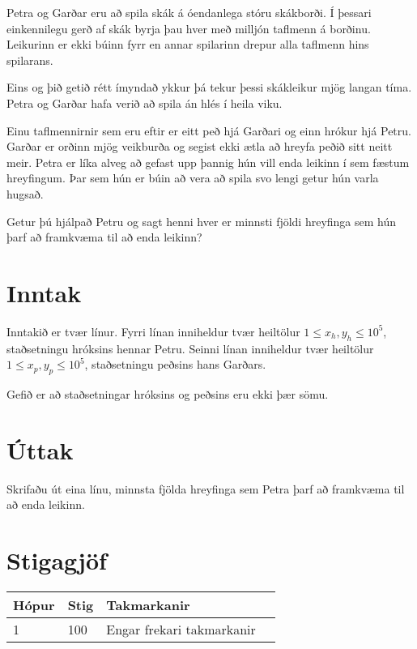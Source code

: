
\noindent
Petra og Garðar eru að spila skák á óendanlega stóru skákborði.
Í þessari einkennilegu gerð af skák byrja þau hver með milljón taflmenn á borðinu.
Leikurinn er ekki búinn fyrr en annar spilarinn drepur alla taflmenn hins spilarans.

Eins og þið getið rétt ímyndað ykkur þá tekur þessi skákleikur mjög langan tíma.
Petra og Garðar hafa verið að spila án hlés í heila viku.

Einu taflmennirnir sem eru eftir er eitt peð hjá Garðari og einn hrókur hjá Petru.
Garðar er orðinn mjög veikburða og segist ekki ætla að hreyfa peðið sitt neitt meir.
Petra er líka alveg að gefast upp þannig hún vill enda leikinn í sem fæstum hreyfingum.
Þar sem hún er búin að vera að spila svo lengi getur hún varla hugsað.

Getur þú hjálpað Petru og sagt henni hver er minnsti fjöldi hreyfinga sem hún þarf að framkvæma
til að enda leikinn?

\section*{Inntak}
Inntakið er tvær línur.
Fyrri línan inniheldur tvær heiltölur $1 \le x_h, y_h \le 10^5$, staðsetningu hróksins hennar Petru.
Seinni línan inniheldur tvær heiltölur $1 \le x_p, y_p \le 10^5$, staðsetningu peðsins hans Garðars.

Gefið er að staðsetningar hróksins og peðsins eru ekki þær sömu.

\section*{Úttak}
Skrifaðu út eina línu, minnsta fjölda hreyfinga sem Petra þarf að framkvæma til að enda leikinn.

\section*{Stigagjöf}
\begin{tabular}{|l|l|l|l|}
\hline
Hópur & Stig & Takmarkanir \\ \hline
1     & 100  & Engar frekari takmarkanir \\ \hline
\end{tabular}
